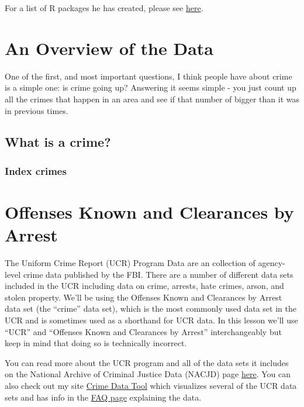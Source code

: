 \documentclass[
  12pt,
  openany]{book}
\begin{document}
For a list of R packages he has created, please see \href{https://jacobdkaplan.com/packages.html}{here}.

\hypertarget{ucr_general}{%
\chapter{An Overview of the Data}\label{ucr_general}}

One of the first, and most important questions, I think people have about crime is a simple one: is crime going up? Answering it seems simple - you just count up all the crimes that happen in an area and see if that number of bigger than it was in previous times.

\hypertarget{what-is-a-crime}{%
\section{What is a crime?}\label{what-is-a-crime}}

\hypertarget{index-crimes}{%
\subsection{Index crimes}\label{index-crimes}}

\hypertarget{offenses_known}{%
\chapter{Offenses Known and Clearances by Arrest}\label{offenses_known}}

The Uniform Crime Report (UCR) Program Data are an collection of agency-level crime data published by the FBI. There are a number of different data sets included in the UCR including data on crime, arrests, hate crimes, arson, and stolen property. We'll be using the Offenses Known and Clearances by Arrest data set (the ``crime'' data set), which is the most commonly used data set in the UCR and is sometimes used as a shorthand for UCR data. In this lesson we'll use ``UCR'' and ``Offenses Known and Clearances by Arrest'' interchangeably but keep in mind that doing so is technically incorrect.

You can read more about the UCR program and all of the data sets it includes on the National Archive of Criminal Justice Data (NACJD) page \href{https://www.icpsr.umich.edu/icpsrweb/content/NACJD/guides/ucr.html}{here}. You can also check out my site \href{http://crimedatatool.com}{Crime Data Tool} which visualizes several of the UCR data sets and has info in the \href{http://crimedatatool.com/faq.html}{FAQ page} explaining the data.
\end{document}
